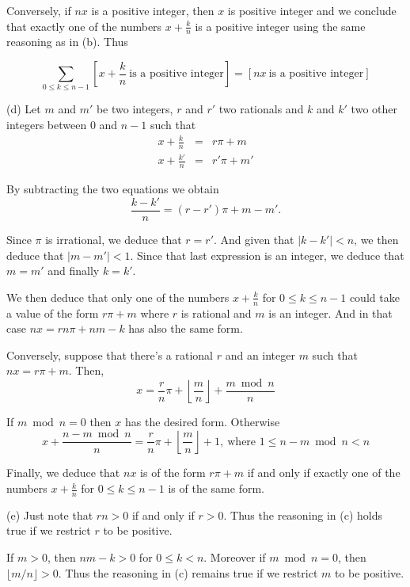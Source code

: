\documentclass[a4paper,12pt]{article}
\newcommand{\subpar}[1]{\medskip \noindent (#1)}
\begin{document}
Conversely, if $nx$ is a positive integer, then $x$ is positive
integer and we conclude that exactly one of the numbers
$x+\frac{k}{n}$ is a positive integer using the same reasoning as in
(b).  Thus

\[ \sum_{0\le k\le n-1} \left[x+\frac{k}{n}\ \mbox{is a positive
    integer}\right] = [ nx\ \mbox{is a positive integer}]\]

\subpar{d} Let $m$ and $m'$ be two integers, $r$ and $r'$ two
rationals and $k$ and $k'$ two other integers between $0$ and $n-1$
such that
\begin{eqnarray*}
  x + \frac{k}{n} &=& r\pi + m \\
  x + \frac{k'}{n} &=& r'\pi + m'
\end{eqnarray*}

By subtracting  the two equations we obtain
\[ \frac{k-k'}{n} = (r-r')\pi + m-m'.\]

Since $\pi$ is irrational, we deduce that $r=r'$.  And given that
$|k-k'| < n$, we then deduce that $|m - m'| < 1$.  Since that last
expression is an integer, we deduce that $m = m'$ and finally $k=k'$.

We then deduce that only one of the numbers $x + \frac{k}{n}$ for
$0\le k\le n-1$ could take a value of the form $r \pi + m$ where $r$
is rational and $m$ is an integer.  And in that case $n x = rn \pi +
nm-k$ has also the same form.

Conversely, suppose that there's a rational $r$ and an integer $m$
such that $nx = r\pi + m$.  Then,
\[ x = \frac{r}{n} \pi + \left\lfloor \frac{m}{n}\right\rfloor +
\frac{m\bmod n}{n}\]

If $m\bmod n = 0$ then $x$ has the desired form.  Otherwise
\[ x + \frac{n-m \bmod n}{n} = \frac{r}{n} \pi + \left\lfloor
\frac{m}{n}\right\rfloor + 1,\ \mbox{where $1\le n - m \bmod n<n$}\]

Finally, we deduce that $nx$ is of the form $r\pi + m$ if and only if
exactly one of the numbers $x + \frac{k}{n}$ for $0\le k \le n-1$ is
of the same form.

\subpar{e}  Just note that $rn > 0$ if and only if $r > 0$.  Thus the
reasoning in (c) holds true if we restrict $r$ to be positive.

If $m>0$, then $nm-k>0$ for $0\le k<n$.  Moreover if $m \bmod n = 0$,
then $\lfloor m/n\rfloor > 0$.  Thus the reasoning in (c) remains true
if we restrict $m$ to be positive.
\end{document}
